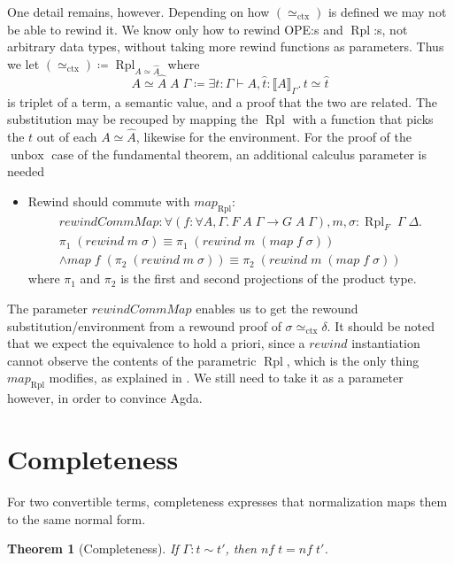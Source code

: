 \documentclass[12pt,twoside,openright]{report}
\numberwithin{equation}{chapter}
\numberwithin{figure}{chapter}
\numberwithin{table}{chapter}
\newtheorem{theorem}{Theorem}
\theoremstyle{definition}\newtheorem{definition}{Definition}
\begin{document}
One detail remains, however.
Depending on how $(\simeq_\text{ctx})$ is defined we may not be able to rewind it.
We know only how to rewind OPE:s and $\operatorname{Rpl}$:s,
not arbitrary data types, without taking more rewind functions as parameters.
Thus we let $(\simeq_\text{ctx}) \coloneqq \operatorname{Rpl}_{A\simeq\widehat A}$ where
$$ A\!\simeq\!\widehat A \; A \; \Gamma \coloneqq \exists t : \Gamma \vdash A, \hat t : \llbracket A \rrbracket_\Gamma.\, t \simeq \hat t $$
is triplet of a term, a semantic value, and a proof that the two are related.
The substitution may be recouped by mapping the $\operatorname{Rpl}$
with a function that picks the $t$ out of each $A\!\simeq\!\widehat A$,
likewise for the environment.
For the proof of the $\operatorname{unbox}$ case of the fundamental theorem,
an additional calculus parameter is needed
\begin{itemize}
\item Rewind should commute with $\textit{map}_{\operatorname{Rpl}}$:
  \begin{multline*}
  \textit{rewindCommMap} : \forall (f : \forall A, \Gamma.\, F \; A \; \Gamma \to G \; A \; \Gamma), m, \sigma : \operatorname{Rpl}_F \; \Gamma \; \Delta. \\
  \pi_1 \; (\textit{rewind} \; m \; \sigma) \equiv \pi_1 \; (\textit{rewind} \; m \; (\textit{map} \; f \; \sigma)) \\
  \land \textit{map} \; f \; (\pi_2 \; (\textit{rewind} \; m \; \sigma)) \equiv \pi_2 \; (\textit{rewind} \; m \; (\textit{map} \; f \; \sigma))
  \end{multline*}
  where $\pi_1$ and $\pi_2$ is the first and second projections of the product type.
\end{itemize}
The parameter $\textit{rewindCommMap}$ enables us
to get the rewound substitution/environment
from a rewound proof of $\sigma \simeq_\text{ctx} \delta$.
It should be noted that we expect the equivalence to hold a priori,
since a $\textit{rewind}$ instantiation cannot observe
the contents of the parametric $\operatorname{Rpl}$,
which is the only thing $\textit{map}_{\operatorname{Rpl}}$ modifies,
as explained in  \cite{wadler89}.
We still need to take it as a parameter however,
in order to convince Agda.

\section{Completeness}

For two convertible terms,
completeness expresses that normalization maps them to the same normal form.
\begin{theorem}[Completeness]
  If $\Gamma : t \sim t'$, then $\textit{nf} \; t = \textit{nf} \; t'$.
\end{theorem}
\end{document}
